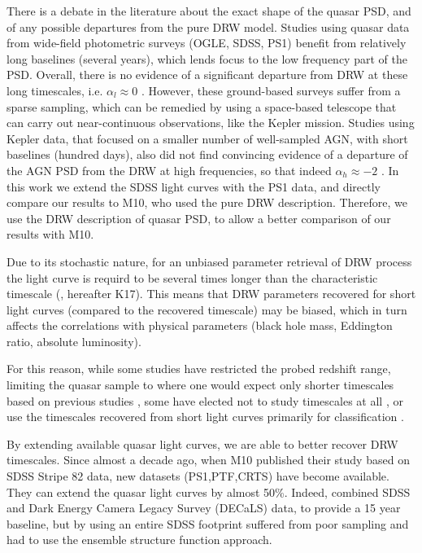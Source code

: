 \documentclass[twocolumn]{aastex62}
\begin{document}
There is a debate in the literature about the exact shape of the quasar PSD, and of any possible  departures from the pure DRW model. Studies using quasar data from wide-field photometric surveys (OGLE, SDSS, PS1) benefit from relatively long baselines (several years), which lends focus to the low frequency part of the PSD. Overall, there is no evidence of a significant departure from DRW at these long timescales, i.e. $\alpha_{l} \approx 0$ \citep{zu2013, simm2016, kozlowski2016b, caplar2017, guo2017, sun2018}. However, these ground-based surveys suffer from a sparse sampling, which can be remedied by using a space-based telescope that can carry out near-continuous observations, like the Kepler mission\citep{borucki2010}. Studies using Kepler data, that focused on a smaller number of well-sampled AGN, with short baselines (hundred days), also did not find convincing evidence of a departure of the AGN PSD from the DRW at high frequencies, so that indeed $\alpha_{h} \approx -2$ \citep{mushotzky2011,edelson2014,smith2018,aranzana2018}. In this work we extend the SDSS light curves with the PS1 data, and directly compare our results to M10, who used the pure DRW description. Therefore, we  use the DRW description of quasar PSD, to allow a better comparison of our results with M10. 

Due to its stochastic nature, for an unbiased parameter retrieval of DRW process the light curve is requird to be several times longer than the characteristic timescale (\citealt{kozlowski2010, kozlowski2017a}, hereafter K17). This means that DRW parameters recovered for short light curves (compared to the recovered timescale) may be biased, which in turn affects the correlations with physical parameters (black hole mass, Eddington ratio, absolute luminosity). 

For this reason, while some studies have restricted the probed redshift range, limiting the quasar sample to where one would expect only shorter timescales based on previous studies \citep{sun2018, guo2017, kelly2013,simm2016}, some have elected not to study timescales at all \citep{sun2018,sanchez2018}, or use the timescales recovered from short light curves primarily for classification \citep{hernitschek2016}.

By extending available quasar light curves, we are able to better recover DRW timescales. Since almost a decade ago, when M10 published their study based on SDSS Stripe 82 data, new datasets (PS1,PTF,CRTS) have become available. They can extend the quasar light curves by almost 50\%.  Indeed, \citet{li2018} combined SDSS and Dark Energy Camera Legacy Survey (DECaLS) data, to provide a 15 year baseline, but by using an entire SDSS footprint suffered from poor sampling and had to use the ensemble structure function approach. %
\end{document}
